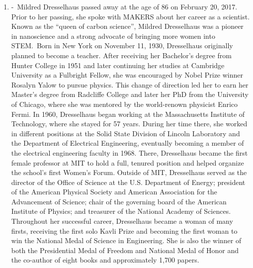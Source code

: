 \documentclass[12pt,a4paper]{article}
\begin{document}
\begin{enumerate}
    \item {} -\ Mildred Dresselhaus passed away at the age of 86 on February 20, 2017. Prior to her passing, she spoke with MAKERS about her career as a scientist. Known as the ``queen of carbon science'', Mildred Dresselhaus was a pioneer in nanoscience and a strong advocate of bringing more women into STEM.\ Born in New York on November 11, 1930, Dresselhaus originally planned to become a teacher. After receiving her Bachelor's degree from Hunter College in 1951 and later continuing her studies at Cambridge University as a Fulbright Fellow, she was encouraged by Nobel Prize winner Rosalyn Yalow to pursue physics. This change of direction led her to earn her Master's degree from Radcliffe College and later her PhD from the University of Chicago, where she was mentored by the world-renown physicist Enrico Fermi. In 1960, Dresselhaus began working at the Massachusetts Institute of Technology, where she stayed for 57 years. During her time there, she worked in different positions at the Solid State Division of Lincoln Laboratory and the Department of Electrical Engineering, eventually becoming a member of the electrical engineering faculty in 1968. There, Dresselhaus became the first female professor at MIT to hold a full, tenured position and helped organize the school's first Women's Forum. Outside of MIT, Dresselhaus served as the director of the Office of Science at the U.S. Department of Energy; president of the American Physical Society and American Association for the Advancement of Science; chair of the governing board of the American Institute of Physics; and treasurer of the National Academy of Sciences. Throughout her successful career, Dresselhaus became a woman of many firsts, receiving the first solo Kavli Prize and becoming the first woman to win the National Medal of Science in Engineering. She is also the winner of both the Presidential Medal of Freedom and National Medal of Honor and the co-author of eight books and approximately 1,700 papers. \href{https://spectrum.ieee.org/geek-life/profiles/mildred-dresselhaus-the-queen-of-carbon}{}

\end{enumerate}
\end{document}
